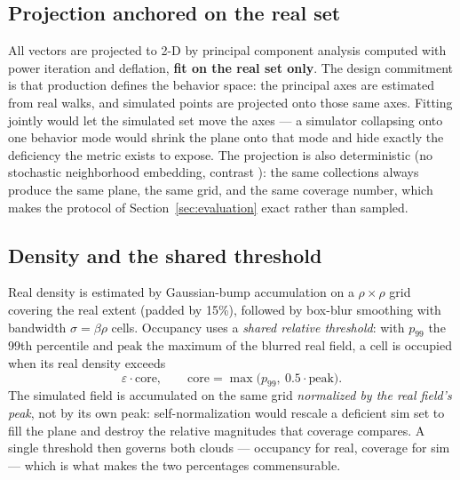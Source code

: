 \subsection{Projection anchored on the real set}
All vectors are projected to 2-D by principal component analysis computed with power iteration
and deflation, \textbf{fit on the real set only}.
The design commitment is that production defines the behavior space: the principal axes are
estimated from real walks, and simulated points are projected onto those same axes.
Fitting jointly would let the simulated set move the axes --- a simulator collapsing onto one
behavior mode would shrink the plane onto that mode and hide exactly the deficiency the metric
exists to expose.
The projection is also deterministic (no stochastic neighborhood embedding, contrast
\citep{wildvis2024}): the same collections always produce the same plane, the same grid, and
the same coverage number, which makes the protocol of Section~\ref{sec:evaluation} exact
rather than sampled.

\subsection{Density and the shared threshold}
Real density is estimated by Gaussian-bump accumulation on a $\rho \times \rho$ grid covering
the real extent (padded by 15\%), followed by box-blur smoothing with bandwidth
$\sigma = \beta \rho$ cells.
Occupancy uses a \emph{shared relative threshold}: with $p_{99}$ the 99th percentile and
$\mathrm{peak}$ the maximum of the blurred real field, a cell is occupied when its real
density exceeds
\begin{equation}
\varepsilon \cdot \mathrm{core}, \qquad \mathrm{core} = \max\!\big(p_{99},\ 0.5 \cdot \mathrm{peak}\big).
\label{eq:threshold}
\end{equation}
The simulated field is accumulated on the same grid \emph{normalized by the real field's
peak}, not by its own peak: self-normalization would rescale a deficient sim set to fill the
plane and destroy the relative magnitudes that coverage compares.
A single threshold then governs both clouds --- occupancy for real, coverage for sim --- which
is what makes the two percentages commensurable.

